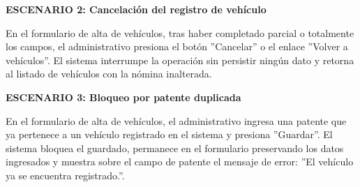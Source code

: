 \documentclass[a4paper,9pt]{article}
\begin{document}
\begin{tcolorbox}[hucard, title={\textbf{HU-9: AGREGAR VEHÍCULO} \hfill \scriptsize \colorbox{bluestatus}{\textbf{\ New\ }} \quad \colorbox{white}{\textcolor{primarydark}{\textbf{\ 2 pts\ }}}}]
{\noindent\textbf{\textcolor{secondarydark}{ESCENARIO 2:  Cancelación del registro de vehículo}}\par\vspace{1pt}
En el formulario de alta de vehículos, tras haber completado parcial o totalmente los campos, el administrativo presiona el botón ''Cancelar'' o el enlace ''Volver a vehículos''. El sistema interrumpe la operación sin persistir ningún dato y retorna al listado de vehículos con la nómina inalterada.\par\vspace{2.5pt}
\noindent\textbf{\textcolor{secondarydark}{ESCENARIO 3:  Bloqueo por patente duplicada}}\par\vspace{1pt}
En el formulario de alta de vehículos, el administrativo ingresa una patente que ya pertenece a un vehículo registrado en el sistema y presiona ''Guardar''. El sistema bloquea el guardado, permanece en el formulario preservando los datos ingresados y muestra sobre el campo de patente el mensaje de error: ''El vehículo ya se encuentra registrado.''.\par\vspace{2.5pt}
}\par
\end{tcolorbox}
\end{document}
